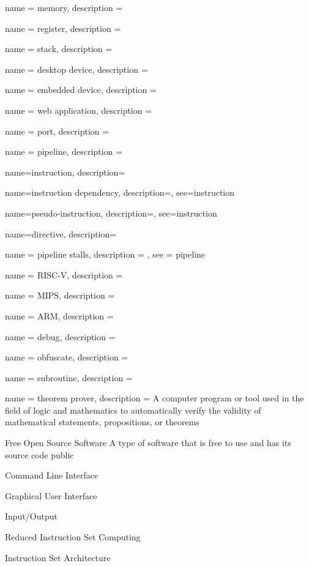  {
  name = {memory},
  description = {}
}

 {
  name = {register},
  description = {}
}

 {
  name = {stack},
  description = {}
}

 {
  name = {desktop device},
  description = {}
}

 {
  name = {embedded device},
  description = {}
}

 {
  name = {web application},
  description = {}
}

 {
  name = {port},
  description = {}
}

 {
  name = {pipeline},
  description = {}
}

 {
  name={instruction},
  description={}
}

 {
  name={instruction dependency},
  description={},
  see={instruction}
}

 {
  name={pseudo-instruction},
  description={},
  see={instruction}
}

 {
  name={directive},
  description={}
}

 {
  name = {pipeline stalls},
  description = {},
  see = {pipeline}
}

 {
  name = {RISC-V},
  description = {}
}

 {
  name = {MIPS},
  description = {}
}

 {
  name = {ARM},
  description = {}
}

 {
  name = {debug},
  description = {}
}

 {
  name = {obfuscate},
  description = {}
}

 {
  name = {subroutine},
  description = {}
}

 {
  name = {theorem prover},
  description = {A computer program or tool used in the field of logic and mathematics to automatically verify the validity of mathematical statements, propositions, or theorems}
}


{Free Open Source Software}
{A type of software that is free to use and has its source code public}

{Command Line Interface}
{}

{Graphical User Interface}
{}

{Input/Output}
{}

{Reduced Instruction Set Computing}
{}

{Instruction Set Architecture}
{}



